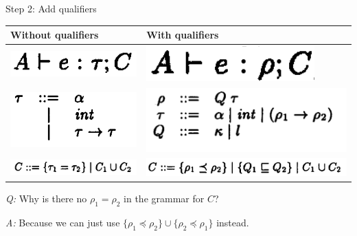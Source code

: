 \documentclass{beamer}
\begin{document}
\begin{frame}{Step 2: Add qualifiers}

\begin{tabular}{l | l}
Without qualifiers & With qualifiers \\
\hline
\includegraphics[scale=0.7]{paper_constraint_judgment.png} & \includegraphics[scale=0.55]{paper_constraint_judgment_qualifs.png}\\
\hline  
\includegraphics[scale=0.55]{paper_figure_1_tau.png} & \includegraphics[scale=0.55]{paper_figure_3_no_label.png} \\
\hline
\includegraphics[scale=0.7]{paper_constraint_grammar.png} & \includegraphics[scale=0.55]{paper_constraint_grammar_qualifs.png}\\
\hline
\end{tabular}

\bigskip
\pause

\textit{Q:} Why is there no $\rho_1 = \rho_2$ in the grammar for $C$?

\pause

\textit{A:} Because we can just use $\{\rho_1 \preceq \rho_2\} \cup \{\rho_2 \preceq \rho_1 \}$ instead.

\end{frame}
\end{document}
